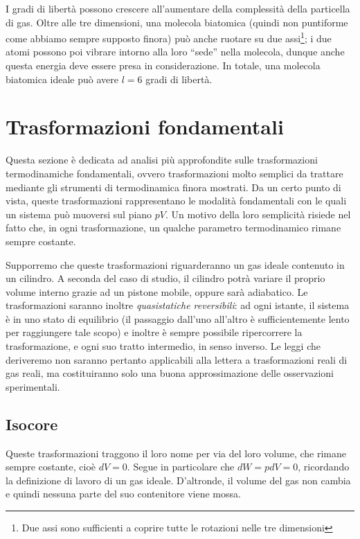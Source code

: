 I gradi di libertà possono crescere all'aumentare della complessità
della particella di gas. Oltre alle tre dimensioni, una molecola
biatomica (quindi non puntiforme come abbiamo sempre supposto finora)
può anche ruotare su due assi\footnote{Due assi sono sufficienti a
coprire tutte le rotazioni nelle tre dimensioni}; i due atomi possono
poi vibrare intorno alla loro ``sede'' nella molecola, dunque anche
questa energia deve essere presa in considerazione. In totale, una
molecola biatomica ideale può avere $l = 6$ gradi di libertà.









\section{Trasformazioni fondamentali}
Questa sezione è dedicata ad analisi più approfondite sulle trasformazioni
termodinamiche fondamentali, ovvero trasformazioni molto semplici da
trattare mediante gli strumenti di termodinamica finora mostrati. Da
un certo punto di vista, queste trasformazioni rappresentano le modalità
fondamentali con le quali un sistema può muoversi sul piano $pV$. Un
motivo della loro semplicità risiede nel fatto che, in ogni trasformazione,
un qualche parametro termodinamico rimane sempre costante.

Supporremo che queste trasformazioni riguarderanno un gas ideale
contenuto in un cilindro. A seconda del caso di studio, il cilindro
potrà variare il proprio volume interno grazie ad un pistone mobile,
oppure sarà adiabatico. Le trasformazioni saranno inoltre \textit{quasistatiche
reversibili}: ad ogni istante, il sistema è in uno stato di
equilibrio (il passaggio dall'uno all'altro è sufficientemente lento
per raggiungere tale scopo) e inoltre è sempre possibile ripercorrere
la trasformazione, e ogni suo tratto intermedio, in senso inverso.
Le leggi che deriveremo non saranno pertanto applicabili alla lettera
a trasformazioni reali di gas reali, ma costituiranno solo una buona
approssimazione delle osservazioni sperimentali.


\subsection{Isocore}
Queste trasformazioni traggono il loro nome per via del loro volume,
che rimane sempre costante, cioè $dV = 0$. Segue in particolare che
$dW = pdV = 0$, ricordando la definizione di lavoro di un gas ideale.
D'altronde, il volume del gas non cambia e quindi nessuna parte del
suo contenitore viene mossa.

